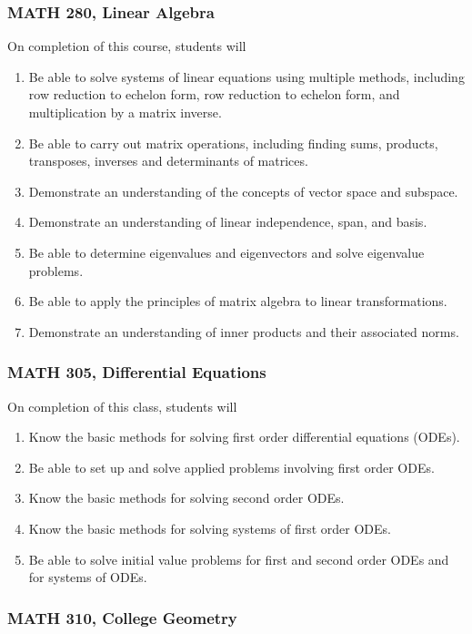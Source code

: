 \documentclass[11pt]{article}
\newenvironment{alphalist}{
\begin{enumerate}[label=(\arabic*),widest=107 ,leftmargin=25pt, itemsep=0pt]}
{\end{enumerate}}
\begin{document}
\subsubsection{MATH 280, Linear Algebra}
On completion of this course, students will
\begin{alphalist}
\item Be able to solve systems of linear equations using multiple methods, including row reduction to echelon form, row reduction to echelon form, and multiplication by a matrix inverse.
\item Be able to carry out matrix operations, including finding sums, products, transposes, inverses and determinants of matrices.
\item Demonstrate an understanding of the concepts of vector space and subspace.
\item Demonstrate an understanding of linear independence, span, and basis.
\item Be able to determine eigenvalues and eigenvectors and solve eigenvalue problems.
\item Be able to apply the principles of matrix algebra to linear transformations.
\item Demonstrate an understanding of inner products and their associated norms.
\end{alphalist} 


\subsubsection{MATH 305, Differential Equations}

On completion of this class, students will
\begin{alphalist}
    \item Know the basic methods for solving first order differential equations (ODEs).
    \item Be able to set up and solve applied problems involving first order ODEs.
    \item Know the basic methods for solving second order ODEs.
    \item Know the basic methods for solving systems of first order ODEs.
    \item Be able to solve initial value problems for first and second order ODEs and for systems of ODEs.
\end{alphalist}

\subsubsection{MATH 310, College Geometry}
\end{document}
